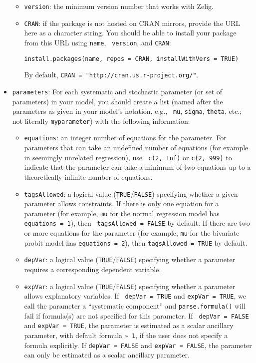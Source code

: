 \begin{itemize}
\begin{itemize}
   \item {\tt version}: the minimum version number that works with
   Zelig.

   \item {\tt CRAN}: if the package is not hosted on CRAN mirrors,
   provide the URL here as a character string.  You should be able
   to install your package from this URL using {\tt name}, {\tt
version}, and {\tt CRAN}:
\begin{verbatim}
install.packages(name, repos = CRAN, installWithVers = TRUE)
\end{verbatim}  
By default, {\tt CRAN = "http://cran.us.r-project.org/"}.  
\end{itemize}

\item {\tt parameters}: For each systematic and stochastic parameter
(or set of parameters) in your model, you should create a list (named
after the parameters as given in your model's notation, e.g., {\tt
mu}, {\tt sigma}, {\tt theta}, etc.; not literally {\tt myparameter})
with the following information:
\begin{itemize}

\item {\tt equations}: an integer number of equations for the
parameter.  For parameters that can take an undefined number of
equations (for example in seemingly unrelated regression), use {\tt
c(2, Inf)} or {\tt c(2, 999)} to indicate that the parameter can take
a minimum of two equations up to a theoretically infinite number of
equations.  

\item {\tt tagsAllowed}: a logical value ({\tt TRUE}/{\tt FALSE})
specifying whether a given parameter allows constraints.  If there is
only one equation for a parameter (for example, {\tt mu} for the
normal regression model has {\tt equations = 1}), then {\tt
tagsAllowed = FALSE} by default.  If there are two or more equations
for the parameter (for example, {\tt mu} for the bivariate probit
model has {\tt equations = 2}), then {\tt tagsAllowed = TRUE} by
default.  

\item {\tt depVar}: a logical value ({\tt TRUE}/{\tt FALSE})
specifying whether a parameter requires a corresponding dependent
variable.  

\item {\tt expVar}: a logical value ({\tt TRUE}/{\tt FALSE})
specifying whether a parameter allows explanatory variables.  If {\tt
depVar = TRUE} and {\tt expVar = TRUE}, we call the parameter a
``systematic component'' and {\tt parse.formula()} will fail if
formula(s) are not specified for this parameter.  If {\tt
depVar = FALSE} and {\tt expVar = TRUE}, the parameter is estimated as
a scalar ancillary parameter, with default formula \verb|~ 1|, if the
user does not specify a formula explicitly.  If {\tt depVar = FALSE}
and {\tt expVar = FALSE}, the parameter can only be estimated as a
scalar ancillary parameter.  


\end{itemize}
\end{itemize}
